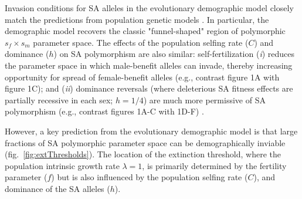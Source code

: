 \documentclass[11pt]{article}
\begin{document}
Invasion conditions for SA alleles in the evolutionary demographic model closely match the predictions from population genetic models \citep{Kidwell1977, JordanConnallon2014, Olito2017}. In particular, the demographic model recovers the classic "funnel-shaped" region of polymorphic $s_f \times s_m$ parameter space. The effects of the population selfing rate ($C$) and dominance ($h$) on SA polymorphism are also similar: self-fertilization ({\itshape i}) reduces the parameter space in which male-benefit alleles can invade, thereby increasing opportunity for spread of female-benefit alleles (e.g., contrast figure 1A with figure 1C); and ({\itshape ii}) dominance reversals (where deleterious SA fitness effects are partially recessive in each sex; $h = 1/4$) are much more permissive of SA polymorphism (e.g., contrast figures 1A-C with 1D-F) \citep{JordanConnallon2014, Olito2017}. 

However, a key prediction from the evolutionary demographic model is that large fractions of SA polymorphic parameter space can be demographically inviable (fig.~\ref{fig:extThresholds}). The location of the extinction threshold, where the population intrinsic growth rate $\lambda = 1$, is primarily determined by the fertility parameter ($f$) but is also influenced by the population selfing rate ($C$), and dominance of the SA alleles ($h$). 

\end{document}
